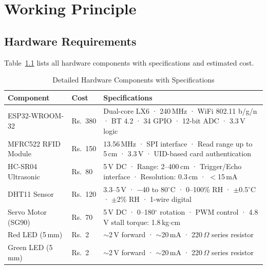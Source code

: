 \documentclass[12pt,a4paper]{report}
\begin{document}
\chapter{Working Principle}

\section{Hardware Requirements}

Table~\ref{tab:hardware} lists all hardware components with specifications and estimated cost.

\begin{table}[h!]
\centering
\caption{Detailed Hardware Components with Specifications}
\label{tab:hardware}
\renewcommand{\arraystretch}{1.3}

\begin{tabular}{|p{3.5cm}|p{1.2cm}|p{8.5cm}|}
\hline
\textbf{Component} & \textbf{Cost} & \textbf{Specifications} \\
\hline

ESP32-WROOM-32 & Rs.~380 & Dual-core LX6 · 240\,MHz · WiFi 802.11 b/g/n · BT 4.2 · 34 GPIO · 12-bit ADC · 3.3\,V logic \\
\hline

MFRC522 RFID Module & Rs.~150 & 13.56\,MHz · SPI interface · Read range up to 5\,cm · 3.3\,V · UID-based card authentication \\
\hline

HC-SR04 Ultrasonic & Rs.~80 & 5\,V DC · Range: 2--400\,cm · Trigger/Echo interface · Resolution: 0.3\,cm · $<$15\,mA \\
\hline

DHT11 Sensor & Rs.~120 & 3.3--5\,V · $-$40 to 80$^\circ$C · 0--100\% RH · $\pm$0.5$^\circ$C · $\pm$2\% RH · 1-wire digital \\
\hline

Servo Motor (SG90) & Rs.~70 & 5\,V DC · 0--180$^\circ$ rotation · PWM control · 4.8\,V stall torque: 1.8\,kg$\cdot$cm \\
\hline

Red LED (5\,mm) & Rs.~2 & $\sim$2\,V forward · $\sim$20\,mA · 220\,$\Omega$ series resistor \\
\hline

Green LED (5\,mm) & Rs.~2 & $\sim$2\,V forward · $\sim$20\,mA · 220\,$\Omega$ series resistor \\
\hline


\end{tabular}
\end{table}
\end{document}
